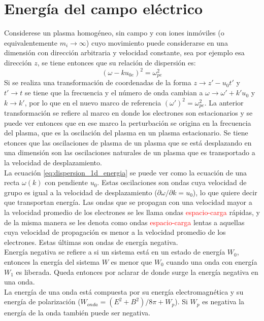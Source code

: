 \section{Energía del campo eléctrico}
Considerese un plasma homogéneo, sin campo y con iones inmóviles (o equivalentemente $m_i \rightarrow \infty$) cuyo movimiento puede considerarse en una dimensión con dirección arbitraria y velocidad constante, sea por ejemplo esa dirección $z$, se tiene entonces que su relación de dispersión es:
\begin{equation}
\label{eq:dispersion_1d_energia}
(\omega - ku_{0e})^2 = \omega_{pe}^2
\end{equation}
Si se realiza una transformación de coordenadas de la forma $z \rightarrow z'-u_0t'$ y $t' \rightarrow t$ se tiene que la frecuencia y el número de onda cambian a $\omega \rightarrow \omega' + k'u_0$ y $k \rightarrow k'$, por lo que en el nuevo marco de referencia $(\omega')^2=\omega_{pe}^2$. La anterior transformación se refiere al marco en donde los electrones son estacionarios y se puede ver entonces que en ese marco la perturbación se origina en la frecuencia del plasma, que es la oscilación del plasma en un plasma estacionario. Se tiene etonces que las oscilaciones de plasma de un plasma que se está desplazando en una dimensión son las oscilaciones naturales de un plasma que es transportado a la velocidad de desplazamiento. \cite{krall1973principles}\\
La ecuación \ref{eq:dispersion_1d_energia} se puede ver como la ecuación de una recta $\omega(k)$ con pendiente $u_0$. Estas oscilaciones son ondas cuya velocidad de grupo es igual a la velocidad de desplazamiento ($\partial \omega /\partial k=u_0$), lo que quiere decir que transportan energía. Las ondas que se propagan con una velocidad mayor a la velocidad promedio de los electrones se les llama ondas \textcolor{red}{espacio-carga} rápidas, y de la misma manera se les denota como ondas \textcolor{red}{espacio-carga} lentas a aquellas cuya velocidad de propagación es menor a la velocidad promedio de los electrones. Estas últimas son ondas de energía negativa.\\
Energía negativa se refiere a si un sistema está en un estado de energía $W_0$, entonces la energía del sistema $W$ es menor que $W_0$ cuando una onda con energía $W_1$ es liberada. Queda entonces por aclarar de donde surge la energía negativa en una onda.\\
La energía de una onda está compuesta por su energía electromagnética y su energía de polarización ($W_{onda}=(E^2 +B^2)/8\pi + W_p$). Si $W_p$ es negativa la energía de la onda también puede ser negativa.\\
